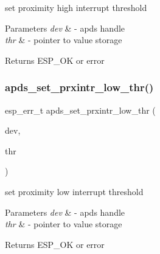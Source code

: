 \begin{DoxyItemize}
\item set proximity high interrupt threshold 
\end{DoxyItemize}


\begin{DoxyParams}{Parameters}
{\em dev} & -\/ apds handle \\
\hline
{\em thr} & -\/ pointer to value storage \\
\hline
\end{DoxyParams}
\begin{DoxyReturn}{Returns}
E\+S\+P\+\_\+\+OK or error 
\end{DoxyReturn}
\mbox{\label{group__APDS9960__ProximityFunctions_ga27a515a43869abcb6085faeedb527128}} 
\subsubsection{\texorpdfstring{apds\+\_\+set\+\_\+prxintr\+\_\+low\+\_\+thr()}{apds\_set\_prxintr\_low\_thr()}}
{\footnotesize\ttfamily esp\+\_\+err\+\_\+t apds\+\_\+set\+\_\+prxintr\+\_\+low\+\_\+thr (\begin{DoxyParamCaption}\item[{\hyperlink{structAPDS9960__Driver}{A\+P\+D\+S\+\_\+\+D\+EV}}]{dev,  }\item[{\hyperlink{vl53l0x__types_8h_aba7bc1797add20fe3efdf37ced1182c5}{uint8\+\_\+t} $\ast$}]{thr }\end{DoxyParamCaption})}




\begin{DoxyItemize}
\item set proximity low interrupt threshold 
\end{DoxyItemize}


\begin{DoxyParams}{Parameters}
{\em dev} & -\/ apds handle \\
\hline
{\em thr} & -\/ pointer to value storage \\
\hline
\end{DoxyParams}
\begin{DoxyReturn}{Returns}
E\+S\+P\+\_\+\+OK or error 
\end{DoxyReturn}
